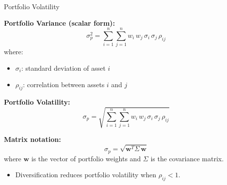 \documentclass[9pt, aspectratio=169, t]{beamer}
\theoremstyle{definition}
\begin{document}
\begin{frame}{Portfolio Volatility}

\textbf{Portfolio Variance (scalar form):}
\[
\sigma_p^2 = \sum_{i=1}^{n}\sum_{j=1}^{n} w_i\, w_j\, \sigma_i\, \sigma_j\, \rho_{ij}
\]
where:
\begin{itemize}
    \item $\sigma_i$: standard deviation of asset $i$
    \item $\rho_{ij}$: correlation between assets $i$ and $j$
\end{itemize}

\vspace{0.3cm}

\textbf{Portfolio Volatility:}
\[
\sigma_p = \sqrt{\sum_{i=1}^{n}\sum_{j=1}^{n} w_i\, w_j\, \sigma_i\, \sigma_j\, \rho_{ij}}
\]

\vspace{0.3cm}

\textbf{Matrix notation:}
\[
\boxed{\sigma_p = \sqrt{\mathbf{w}^T \Sigma\, \mathbf{w}}}
\]
where $\mathbf{w}$ is the vector of portfolio weights and $\Sigma$ is the covariance matrix.

\vspace{0.2cm}

\begin{itemize}
    \item Diversification reduces portfolio volatility when $\rho_{ij} < 1$.
\end{itemize}

\end{frame}
\end{document}
